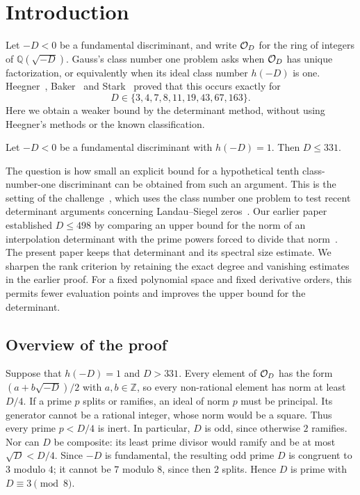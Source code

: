 \section{Introduction}\label{sec:intro}
Let $-D<0$ be a fundamental discriminant, and write $\mathcal O_D$ for the
ring of integers of $\mathbb Q(\sqrt{-D})$.
Gauss's class number one problem asks when $\mathcal O_D$ has unique factorization,
or equivalently when its ideal class number $h(-D)$ is one.
Heegner~\cite{heegner}, Baker~\cite{baker} and Stark~\cite{stark} proved that
this occurs exactly for
\begingroup
\abovedisplayskip=14pt
\belowdisplayskip=14pt
\abovedisplayshortskip=14pt
\belowdisplayshortskip=14pt
\[
 D\in\{3,4,7,8,11,19,43,67,163\}.
\]
\endgroup
Here we obtain a weaker bound by the determinant method, without using
Heegner's methods or the known classification.

\begin{theorem}\label{thm:main}
Let $-D<0$ be a fundamental discriminant with $h(-D)=1$.  Then
$D\leq331$.
\end{theorem}

The question is how small an explicit bound for a hypothetical tenth
class-number-one discriminant can be obtained from such an argument.  This
is the setting of the challenge~\cite{tao2026}, which uses the class
number one problem to test recent determinant arguments concerning
Landau--Siegel zeros~\cite{green2026,taosketch}.  Our earlier paper established
$D\leq498$ by comparing an upper bound for the norm of an interpolation
determinant with the prime powers forced to divide that norm~\cite{chung498}.
The present paper keeps that determinant and its spectral size estimate.
We sharpen the rank criterion by retaining the exact degree and vanishing
estimates in the earlier proof.  For a fixed polynomial space and fixed
derivative orders, this permits fewer evaluation points and improves the
upper bound for the determinant.

\subsection{Overview of the proof}\label{subsec:overview}
Suppose that $h(-D)=1$ and $D>331$.  Every element of $\mathcal O_D$ has the form
$(a+b\sqrt{-D})/2$ with $a,b\in\mathbb Z$, so every non-rational element
has norm at least $D/4$.  If a prime $p$ splits or ramifies, an ideal of
norm $p$ must be principal.  Its generator cannot be a rational integer,
whose norm would be a square.  Thus every prime $p<D/4$ is inert.  In
particular, $D$ is odd, since otherwise $2$ ramifies.  Nor can $D$ be
composite: its least prime divisor would ramify and be at most
$\sqrt D<D/4$.  Since $-D$ is fundamental, the resulting odd prime $D$ is
congruent to $3$ modulo $4$; it cannot be $7$ modulo $8$, since then $2$
splits.  Hence $D$ is prime with $D\equiv3\pmod8$.

